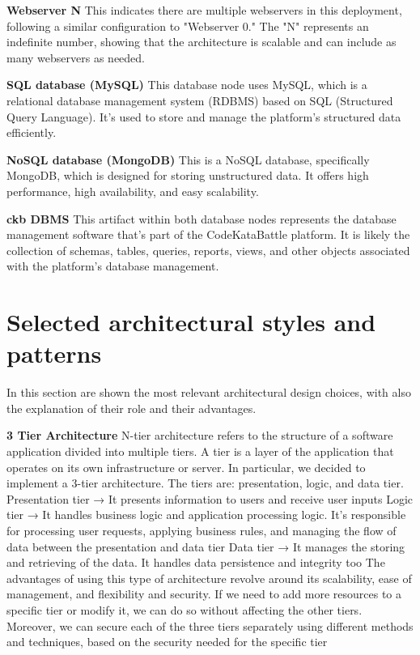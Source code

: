 \noindent\textbf{Webserver N}\newline
This indicates there are multiple webservers in this deployment, following a similar configuration to "Webserver 0." 
The "N" represents an indefinite number, showing that the architecture is scalable and can include as many webservers as needed.

\noindent\textbf{SQL database (MySQL)}\newline
This database node uses MySQL, which is a relational database management system (RDBMS) based on SQL (Structured Query Language). 
It's used to store and manage the platform's structured data efficiently.

\noindent\textbf{NoSQL database (MongoDB)}\newline
This is a NoSQL database, specifically MongoDB, which is designed for storing unstructured data. It offers high performance, high availability, and easy scalability.

\noindent\textbf{ckb DBMS}\newline
This artifact within both database nodes represents the database management software that's part of the CodeKataBattle platform. It is likely the collection of schemas, 
tables, queries, reports, views, and other objects associated with the platform's database management.

\section{Selected architectural styles and patterns}

In this section are shown the most relevant architectural design choices, with also the explanation of their role and their advantages.

\textbf{3 Tier Architecture}\newline
N-tier architecture refers to the structure of a software application divided into multiple tiers. 
A tier is a layer of the application that operates on its own infrastructure or server. 
In particular, we decided to implement a 3-tier architecture. The tiers are: presentation, logic, and data tier.\newline
Presentation tier → It presents information to users and receive user inputs\newline
Logic tier → It handles business logic and application processing logic. It’s responsible for processing user requests, 
applying business rules, and managing the flow of data between the presentation and data tier\newline
Data tier → It manages the storing and retrieving of the data. It handles data persistence and integrity too\newline
The advantages of using this type of architecture revolve around its scalability, ease of management, and flexibility and security. 
If we need to add more resources to a specific tier or modify it, we can do so without affecting the other tiers. Moreover, we can secure each 
of the three tiers separately using different methods and techniques, based on the security needed for the specific tier


